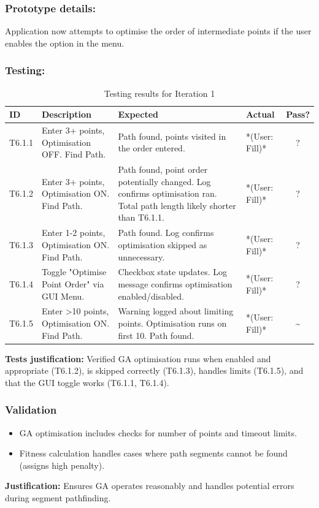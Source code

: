 \subsubsection{Prototype details:}
Application now attempts to optimise the order of intermediate points if the user enables the option in the menu.

\subsubsection{Testing:} %
\begin{table}[htbp]
	\centering
	\begin{tabularx}{\textwidth}{|l|X|p{4.5cm}|p{1.5cm}|c|}
		\hline
		\textbf{ID} & \textbf{Description} & \textbf{Expected} & \textbf{Actual} & \textbf{Pass?} \\
		\hline
		T6.1.1 & Enter 3+ points, Optimisation OFF. Find Path. & Path found, points visited in the order entered. & *(User: Fill)* & ? \\
		\hline
		T6.1.2 & Enter 3+ points, Optimisation ON. Find Path. & Path found, point order potentially changed. Log confirms optimisation ran. Total path length likely shorter than T6.1.1. & *(User: Fill)* & ? \\
		\hline
		T6.1.3 & Enter 1-2 points, Optimisation ON. Find Path. & Path found. Log confirms optimisation skipped as unnecessary. & *(User: Fill)* & ? \\
		\hline
		T6.1.4 & Toggle "Optimise Point Order" via GUI Menu. & Checkbox state updates. Log message confirms optimisation enabled/disabled. & *(User: Fill)* & ? \\
		\hline
		T6.1.5 & Enter >10 points, Optimisation ON. Find Path. & Warning logged about limiting points. Optimisation runs on first 10. Path found. & *(User: Fill)* & \~{} \\
		\hline
	\end{tabularx}
	\caption{Testing results for Iteration 1}
\end{table}
\textbf{Tests justification:} Verified GA optimisation runs when enabled and appropriate (T6.1.2), is skipped correctly (T6.1.3), handles limits (T6.1.5), and that the GUI toggle works (T6.1.1, T6.1.4).

\subsubsection{Validation}
\begin{itemize}
	\item GA optimisation includes checks for number of points and timeout limits.
	\item Fitness calculation handles cases where path segments cannot be found (assigns high penalty).
\end{itemize}
\textbf{Justification:} Ensures GA operates reasonably and handles potential errors during segment pathfinding.

